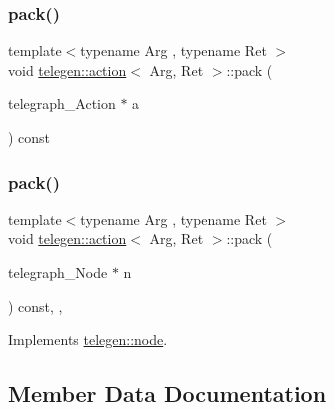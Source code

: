 \mbox{\label{classtelegen_1_1action_af6b57000174dc90257d52261cc9ef444}} 
\subsubsection{\texorpdfstring{pack()}{pack()}\hspace{0.1cm}{\footnotesize\ttfamily [1/2]}}
{\footnotesize\ttfamily template$<$typename Arg , typename Ret $>$ \\
void \hyperlink{classtelegen_1_1action}{telegen\+::action}$<$ Arg, Ret $>$\+::pack (\begin{DoxyParamCaption}\item[{telegraph\+\_\+\+Action $\ast$}]{a }\end{DoxyParamCaption}) const\hspace{0.3cm}{\ttfamily [inline]}}

\mbox{\label{classtelegen_1_1action_a0e5686b3bf433afab1b0fda1002f95b0}} 
\subsubsection{\texorpdfstring{pack()}{pack()}\hspace{0.1cm}{\footnotesize\ttfamily [2/2]}}
{\footnotesize\ttfamily template$<$typename Arg , typename Ret $>$ \\
void \hyperlink{classtelegen_1_1action}{telegen\+::action}$<$ Arg, Ret $>$\+::pack (\begin{DoxyParamCaption}\item[{telegraph\+\_\+\+Node $\ast$}]{n }\end{DoxyParamCaption}) const\hspace{0.3cm}{\ttfamily [inline]}, {\ttfamily [override]}, {\ttfamily [virtual]}}



Implements \hyperlink{classtelegen_1_1node_a8b6169d62f6e7c2e301435e52442fed3}{telegen\+::node}.



\subsection{Member Data Documentation}
\mbox{\label{classtelegen_1_1action_ae81a51a3863b0aa3c8f5bd6eab375681}} 
